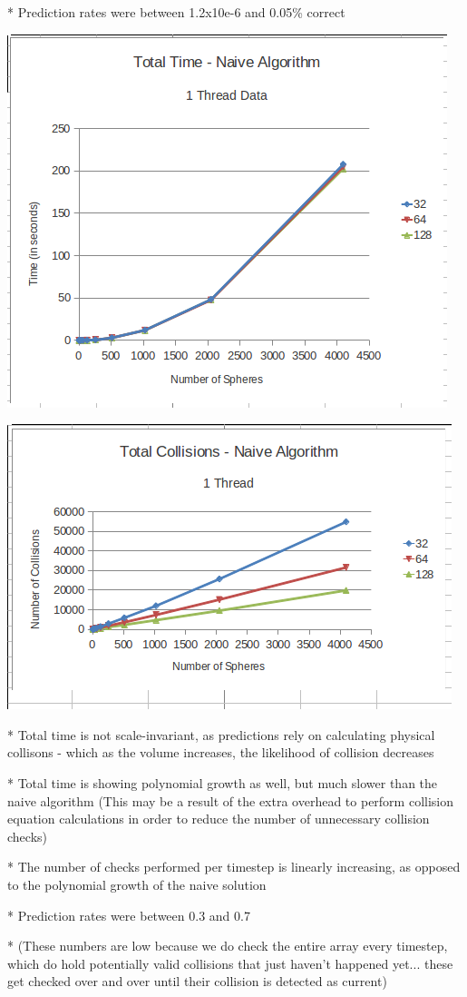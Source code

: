 \documentclass[conference]{IEEEtran}
\begin{document}
* Prediction rates were between 1.2x10e-6 and 0.05\% correct

\begin{center}
	\includegraphics[width=.45\textwidth]{runtime_naive_1thread.png}
\end{center}

\begin{center}
	\includegraphics[width=.45\textwidth]{collisions_naive_1thread.png}
\end{center}

* Total time is not scale-invariant, as predictions rely on calculating physical collisons - which as the volume increases, the likelihood of collision decreases

* Total time is showing polynomial growth as well, but much slower than the naive algorithm (This may be a result of the extra overhead to perform collision equation calculations in order to reduce the number of unnecessary collision checks)

* The number of checks performed per timestep is linearly increasing, as opposed to the polynomial growth of the naive solution

* Prediction rates were between 0.3 and 0.7%

* (These numbers are low because we do check the entire array every timestep, which do hold potentially valid collisions that just haven't happened yet... these get checked over and over until their collision is detected as current)
\end{document}
